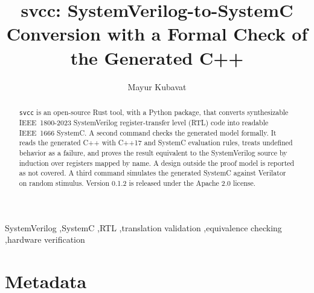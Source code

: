 \documentclass[preprint,12pt]{elsarticle}
\newcommand{\code}[1]{\texttt{#1}}
\begin{document}
\begin{frontmatter}

\title{svcc: SystemVerilog-to-SystemC Conversion with a Formal Check of the Generated C++}

\author{Mayur Kubavat}

\begin{abstract}
\code{svcc} is an open-source Rust tool, with a Python package, that converts synthesizable
IEEE~1800-2023 SystemVerilog register-transfer level (RTL) code into readable IEEE~1666 SystemC.
A second command checks the generated model formally. It reads the generated C++ with C++17 and
SystemC evaluation rules, treats undefined behavior as a failure, and proves the result equivalent
to the SystemVerilog source by induction over registers mapped by name. A design outside the proof
model is reported as not covered. A third command simulates the generated SystemC against
Verilator on random stimulus. Version 0.1.2 is released under the Apache 2.0 license.
\end{abstract}

\begin{keyword}
SystemVerilog \sep SystemC \sep RTL \sep translation validation \sep equivalence checking \sep hardware verification
\end{keyword}

\end{frontmatter}

\section*{Metadata}
\end{document}
